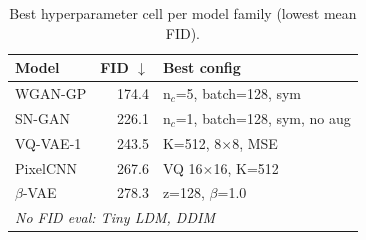 \begin{table}[H]
    \centering
    \caption{Best hyperparameter cell per model family (lowest mean FID).}
    \label{tab:fid_best}
    \begin{tabular}{lrl}
        \toprule
        \textbf{Model} & \textbf{FID} $\downarrow$ & \textbf{Best config} \\
        \midrule
        WGAN-GP & 174.4 & n$_c$=5, batch=128, sym \\
        SN-GAN & 226.1 & n$_c$=1, batch=128, sym, no aug \\
        VQ-VAE-1 & 243.5 & K=512, 8$\times$8, MSE \\
        PixelCNN & 267.6 & VQ 16$\times$16, K=512 \\
        $\beta$-VAE & 278.3 & z=128, $\beta$=1.0 \\
        \midrule
        \multicolumn{3}{l}{\textit{No FID eval: Tiny LDM, DDIM}} \\
        \bottomrule
    \end{tabular}
\end{table}
